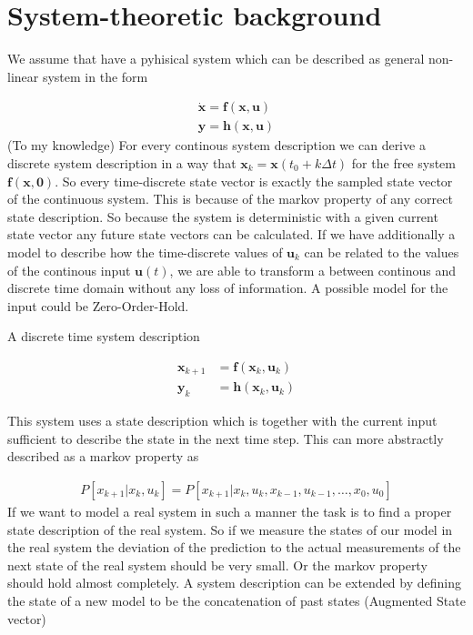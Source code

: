 \documentclass[a4paper, 10pt]{article}
\begin{document}
\section*{System-theoretic background}


We assume that have a pyhisical system which can be described as general non-linear system in the form

\begin{align*}
\dot{\bm{x}}=\bm{f}(\bm{x},\bm{u}) \\
\bm{y}=\bm{h}(\bm{x},\bm{u})
\end{align*}
(To my knowledge) For every continous system description we can derive a discrete system description in a way that $\bm{x}_k=\bm{x}(t_0+k\Delta t)$ for the free system $\bm{f}(\bm{x},\bm{0})$.
So every time-discrete state vector is exactly the sampled state vector of the continuous system.
This is because of the markov property of any correct state description.
So because the system is deterministic with a given current state vector any future state vectors can be calculated.
If we have additionally a model to describe how the time-discrete values of $\bm{u}_k$ can be related to the values of the continous input $\bm{u}(t)$, we are able to transform a between continous and discrete time domain without any loss of information.
A possible model for the input could be Zero-Order-Hold.


A discrete time system description

\begin{align*}
\bm{x}_{k+1} &= \bm{f}(\bm{x}_k,\bm{u}_k)
\\
\bm{y}_{k} &= \bm{h}(\bm{x}_k, \bm{u}_k)
\end{align*}

This system uses a state description which is together with the current input sufficient to describe the state in the next time step.
This can more abstractly described as a markov property as

\begin{align*}
P[x_{k+1}|x_k,u_k] = P[x_{k+1}|x_k,u_k,x_{k-1},u_{k-1},\dots,x_0,u_0]
\end{align*}
If we want to model a real system in such a manner the task is to find a proper state description of the real system.
So if we measure the states of our model in the real system the deviation of the prediction to the actual measurements of the next state of the real system should be very small.
Or the markov property should hold almost completely.
A system description can be extended by defining the state of a new model to be the concatenation of past states (Augmented State vector)
\end{document}
